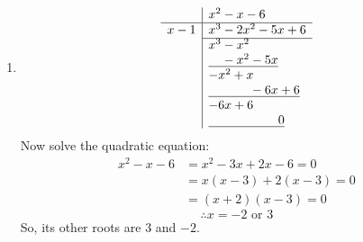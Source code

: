 \begin{multicols}{2}
\begin{enumerate}[label={\textbf{\arabic*.}}]
    \item 
        \[
        \begin{array}{r|l}
        & x^2 - x - 6 \\
        \hline
        x - 1 & x^3 - 2x^2 - 5x + 6 \\
        \cline{2-2}
        & x^3 - x^2 \\
        & \underline{\phantom{x^3} - x^2 - 5x} \\
        & - x^2 + x \\
        & \underline{\phantom{x^3 - x^2} - 6x + 6} \\
        & - 6x + 6 \\
        & \underline{\phantom{x^3 - x^2 - 6x} 0}
        \end{array}
        \]
        Now solve the quadratic equation:
        \begin{align*}
            x^2 - x - 6 &= x^2 - 3x + 2x - 6 = 0 \\
            &= x(x - 3) + 2(x - 3) = 0 \\
            &= (x + 2)(x - 3) = 0
        \end{align*}
        \[\therefore x = -2 \text{ or } 3\]
        So, its other roots are \(3\) and \(-2\).


\end{enumerate}
\end{multicols}
